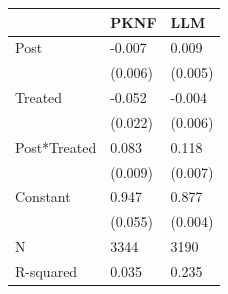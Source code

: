 \begin{tabular}{lll}
\toprule
 & PKNF & LLM \\
\midrule
Post & -0.007 & 0.009 \\
 & (0.006) & (0.005) \\
Treated & -0.052 & -0.004 \\
 & (0.022) & (0.006) \\
Post*Treated & 0.083 & 0.118 \\
 & (0.009) & (0.007) \\
Constant & 0.947 & 0.877 \\
 & (0.055) & (0.004) \\
N & 3344 & 3190 \\
R-squared & 0.035 & 0.235 \\
\bottomrule
\end{tabular}
